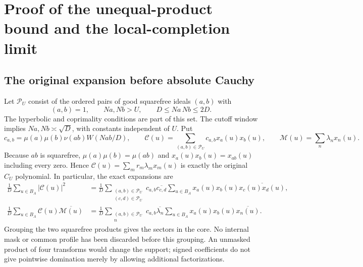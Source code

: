 \section{Proof of the unequal-product bound and the local-completion limit}
\label{upq:details}

\subsection{The original expansion before absolute Cauchy}
Let $\mathcal P_U$ consist of the ordered pairs of good squarefree ideals
$(a,b)$ with
\[
 (a,b)=1,\qquad Na,Nb>U,\qquad D\le Na\,Nb\le2D.
\]
The hyperbolic and coprimality conditions are part of this set. The cutoff
window implies $Na,Nb\asymp\sqrt D$, with constants independent of $U$.
Put
\[
 c_{a,b}=\mu(a)\mu(b)\nu(ab)W(Nab/D),\qquad
 \mathcal C(u)=\sum_{(a,b)\in\mathcal P_U}c_{a,b}x_a(u)x_b(u),
 \qquad
 \mathcal M(u)=\sum_n\lambda_nx_n(u).
\]
Because $ab$ is squarefree, $\mu(a)\mu(b)=\mu(ab)$ and
$x_a(u)x_b(u)=x_{ab}(u)$ including every zero. Hence
$\mathcal C(u)=\sum_mr_m\lambda_mx_m(u)$ is exactly the original
$C_U$ polynomial. In particular, the exact expansions are
\begin{align}
 \frac1D\sum_{u\in B_A}|\mathcal C(u)|^2
 &=\frac1D\sum_{\substack{(a,b)\in\mathcal P_U\\
                          (c,d)\in\mathcal P_U}}
 c_{a,b}\overline{c_{c,d}}
 \sum_{u\in B_A}x_a(u)x_b(u)
       \overline{x_c(u)x_d(u)},                         \label{upq:four}\\
 \frac1D\sum_{u\in B_A}\mathcal C(u)\overline{\mathcal M(u)}
 &=\frac1D\sum_{\substack{(a,b)\in\mathcal P_U\\n}}
 c_{a,b}\overline{\lambda_n}
 \sum_{u\in B_A}x_a(u)x_b(u)\overline{x_n(u)}.           \label{upq:mixed}
\end{align}
Grouping the two squarefree products gives the sectors in the core.
No internal mask or common profile has been discarded before this
grouping. An unmasked product of four transforms would change the
support; signed coefficients do not give pointwise domination merely
by allowing additional factorizations.

